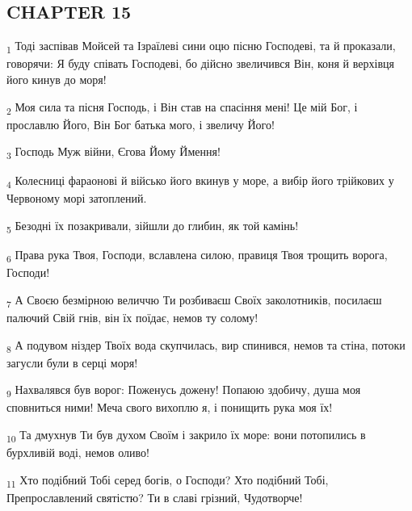 \subsection{CHAPTER 15}
\begin{tcolorbox}
\textsubscript{1} Тоді заспівав Мойсей та Ізраїлеві сини оцю пісню Господеві, та й проказали, говорячи: Я буду співать Господеві, бо дійсно звеличився Він, коня й верхівця його кинув до моря!
\end{tcolorbox}
\begin{tcolorbox}
\textsubscript{2} Моя сила та пісня Господь, і Він став на спасіння мені! Це мій Бог, і прославлю Його, Він Бог батька мого, і звеличу Його!
\end{tcolorbox}
\begin{tcolorbox}
\textsubscript{3} Господь Муж війни, Єгова Йому Ймення!
\end{tcolorbox}
\begin{tcolorbox}
\textsubscript{4} Колесниці фараонові й військо його вкинув у море, а вибір його трійкових у Червоному морі затоплений.
\end{tcolorbox}
\begin{tcolorbox}
\textsubscript{5} Безодні їх позакривали, зійшли до глибин, як той камінь!
\end{tcolorbox}
\begin{tcolorbox}
\textsubscript{6} Права рука Твоя, Господи, вславлена силою, правиця Твоя трощить ворога, Господи!
\end{tcolorbox}
\begin{tcolorbox}
\textsubscript{7} А Своєю безмірною величчю Ти розбиваєш Своїх заколотників, посилаєш палючий Свій гнів, він їх поїдає, немов ту солому!
\end{tcolorbox}
\begin{tcolorbox}
\textsubscript{8} А подувом ніздер Твоїх вода скупчилась, вир спинився, немов та стіна, потоки загусли були в серці моря!
\end{tcolorbox}
\begin{tcolorbox}
\textsubscript{9} Нахвалявся був ворог: Поженусь дожену! Попаюю здобичу, душа моя сповниться ними! Меча свого вихоплю я, і понищить рука моя їх!
\end{tcolorbox}
\begin{tcolorbox}
\textsubscript{10} Та дмухнув Ти був духом Своїм і закрило їх море: вони потопились в бурхливій воді, немов оливо!
\end{tcolorbox}
\begin{tcolorbox}
\textsubscript{11} Хто подібний Тобі серед богів, о Господи? Хто подібний Тобі, Препрославлений святістю? Ти в славі грізний, Чудотворче!
\end{tcolorbox}
